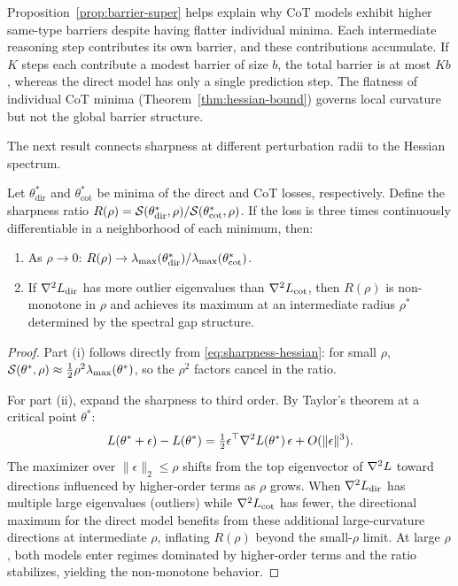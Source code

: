 \begin{remark}\label{rem:barrier-explain}
  Proposition~\ref{prop:barrier-super} helps explain why CoT models exhibit
  higher same-type barriers despite having flatter individual minima. Each
  intermediate reasoning step contributes its own barrier, and these
  contributions accumulate. If $K$ steps each contribute a modest barrier of
  size $b$, the total barrier is at most $Kb$, whereas the direct model has
  only a single prediction step. The flatness of individual CoT minima
  (Theorem~\ref{thm:hessian-bound}) governs local curvature but not the
  global barrier structure.
\end{remark}

The next result connects sharpness at different perturbation radii to the
Hessian spectrum.

\begin{proposition}\label{prop:sharpness-ratio}
  Let $\theta^*_{\mathrm{dir}}$ and $\theta^*_{\mathrm{cot}}$ be minima of
  the direct and CoT losses, respectively. Define the sharpness ratio
  $R(\rho) = \mathcal{S}(\theta^*_{\mathrm{dir}}, \rho) /
  \mathcal{S}(\theta^*_{\mathrm{cot}}, \rho)$. If the loss is three times
  continuously differentiable in a neighborhood of each minimum, then:
  \begin{enumerate}[label=(\roman*)]
    \item As $\rho \to 0$:
      $R(\rho) \to \lambda_{\max}(\theta^*_{\mathrm{dir}}) /
      \lambda_{\max}(\theta^*_{\mathrm{cot}})$.
    \item If $\nabla^2 L_{\mathrm{dir}}$ has more outlier eigenvalues than
      $\nabla^2 L_{\mathrm{cot}}$, then $R(\rho)$ is non-monotone in $\rho$ and achieves
      its maximum at an intermediate radius $\rho^*$ determined by the spectral
      gap structure.
  \end{enumerate}
\end{proposition}

\begin{proof}
  Part (i) follows directly from \eqref{eq:sharpness-hessian}: for small $\rho$,
  $\mathcal{S}(\theta^*, \rho) \approx \frac{1}{2}\rho^2\lambda_{\max}(\theta^*)$, so the
  $\rho^2$ factors cancel in the ratio.

  For part (ii), expand the sharpness to third order. By Taylor's theorem at a
  critical point $\theta^*$:
  \[
    L(\theta^* + \epsilon) - L(\theta^*) = \tfrac{1}{2}\epsilon^\top \nabla^2
    L(\theta^*)\, \epsilon + O(\|\epsilon\|^3).
  \]
  The maximizer over $\|\epsilon\|_2 \le \rho$ shifts from the top eigenvector
  of $\nabla^2 L$ toward directions influenced by higher-order terms as $\rho$
  grows. When $\nabla^2 L_{\mathrm{dir}}$ has multiple large eigenvalues (outliers)
  while $\nabla^2 L_{\mathrm{cot}}$ has fewer, the directional maximum for the direct model
  benefits from these additional large-curvature directions at intermediate
  $\rho$, inflating $R(\rho)$ beyond the small-$\rho$ limit. At large $\rho$,
  both models enter regimes dominated by higher-order terms and the ratio
  stabilizes, yielding the non-monotone behavior.
\end{proof}

